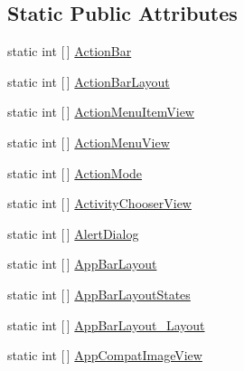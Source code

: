 \subsection*{Static Public Attributes}
\begin{DoxyCompactItemize}
\item 
static int \mbox{[}$\,$\mbox{]} \mbox{\hyperlink{class_f_w_p_s___app_1_1_droid_1_1_resource_1_1_styleable_a7381bf299215d299521e9664e15dad7d}{Action\+Bar}}
\item 
static int \mbox{[}$\,$\mbox{]} \mbox{\hyperlink{class_f_w_p_s___app_1_1_droid_1_1_resource_1_1_styleable_aaf1f3d8895e00126b8dd3e5a9ab900f9}{Action\+Bar\+Layout}}
\item 
static int \mbox{[}$\,$\mbox{]} \mbox{\hyperlink{class_f_w_p_s___app_1_1_droid_1_1_resource_1_1_styleable_a0da2cd51e182bd8b1095161a9b239ecd}{Action\+Menu\+Item\+View}}
\item 
static int \mbox{[}$\,$\mbox{]} \mbox{\hyperlink{class_f_w_p_s___app_1_1_droid_1_1_resource_1_1_styleable_a68c89515583416f1faa31d0b2e132d8a}{Action\+Menu\+View}}
\item 
static int \mbox{[}$\,$\mbox{]} \mbox{\hyperlink{class_f_w_p_s___app_1_1_droid_1_1_resource_1_1_styleable_a353c1ea202025880140b49e5f8639e70}{Action\+Mode}}
\item 
static int \mbox{[}$\,$\mbox{]} \mbox{\hyperlink{class_f_w_p_s___app_1_1_droid_1_1_resource_1_1_styleable_a5ed0789202820341a0f07f68a06bb6e8}{Activity\+Chooser\+View}}
\item 
static int \mbox{[}$\,$\mbox{]} \mbox{\hyperlink{class_f_w_p_s___app_1_1_droid_1_1_resource_1_1_styleable_a46901f484610ada83c3a18bb9158ca0b}{Alert\+Dialog}}
\item 
static int \mbox{[}$\,$\mbox{]} \mbox{\hyperlink{class_f_w_p_s___app_1_1_droid_1_1_resource_1_1_styleable_aa7562a9ff727bb5094f318f661f7e073}{App\+Bar\+Layout}}
\item 
static int \mbox{[}$\,$\mbox{]} \mbox{\hyperlink{class_f_w_p_s___app_1_1_droid_1_1_resource_1_1_styleable_ad69eea4d2953a21a74e09a32c6ccf0c7}{App\+Bar\+Layout\+States}}
\item 
static int \mbox{[}$\,$\mbox{]} \mbox{\hyperlink{class_f_w_p_s___app_1_1_droid_1_1_resource_1_1_styleable_aa014391ffdfce45ed4f3116e87e530fc}{App\+Bar\+Layout\+\_\+\+Layout}}
\item 
static int \mbox{[}$\,$\mbox{]} \mbox{\hyperlink{class_f_w_p_s___app_1_1_droid_1_1_resource_1_1_styleable_a385071a4c39a4013736ad742676d90c7}{App\+Compat\+Image\+View}}
\item 

\end{DoxyCompactItemize}

